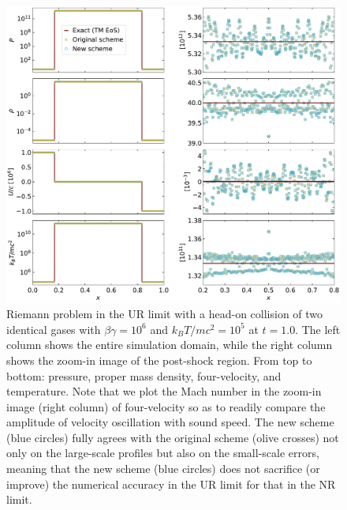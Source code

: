 \begin{figure}
\includegraphics[width=\linewidth]{figures/HeadCollision.pdf}
\caption{Riemann problem in the UR limit with a head-on collision of two identical gases with $\beta\gamma=10^{6}$ and $k_{B}T/mc^2=10^{5}$ at $t=1.0$. The left column shows the entire simulation domain, while the right column shows the zoom-in image of the post-shock region. From top to bottom: pressure, proper mass density, four-velocity, and temperature. Note that we plot the Mach number in the zoom-in image (right column) of four-velocity so as to readily compare the amplitude of velocity oscillation with sound speed. The new scheme (blue circles) fully agrees with the original scheme (olive crosses) not only on the large-scale profiles but also on the small-scale errors, meaning that the new scheme (blue circles) does not sacrifice (or improve) the numerical accuracy in the UR limit for  that in the NR limit.}
\label{fig:head-on collision shock tube}
\end{figure}


